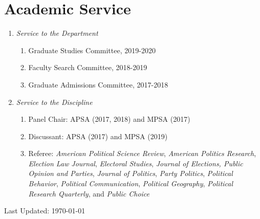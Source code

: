 \documentclass[12pt]{article}
\def\footerlink{}
\begin{document}
\section*{Academic Service} 

\begin{enumerate}[topsep = 0pt, itemsep = -1ex, partopsep  = 1ex, parsep = 1ex]
	
	\item[] \textit{Service to the Department}
	
	\begin{enumerate}[topsep = 0pt, itemsep = -1ex, partopsep = -1ex, parsep = 1ex]
		
		\item[] Graduate Studies Committee, 2019-2020
		\item[] Faculty Search Committee, 2018-2019 
		\item[] Graduate Admissions Committee, 2017-2018 \\
		
	\end{enumerate}

	\item[] \textit{Service to the Discipline}

	\begin{enumerate}[topsep = 0pt, itemsep = -1ex, partopsep  = -1ex, parsep = 1ex]
	
	\item[] Panel Chair: APSA (2017, 2018) and MPSA (2017)
	
	\item[] Discussant: APSA (2017) and MPSA (2019)
	
	\item[] Referee: \textit{American Political Science Review}, \textit{American Politics Research}, \textit{Election Law Journal}, \textit{Electoral Studies}, \textit{Journal of Elections, Public Opinion and Parties}, \textit{Journal of Politics},  \textit{Party Politics}, \textit{Political Behavior}, \textit{Political Communication}, \textit{Political Geography}, \textit{Political Research Quarterly}, and \textit{Public Choice} \\
	
	\end{enumerate}

\end{enumerate}

\bigskip

\begin{center}
  \begin{footnotesize}
    Last Updated: \today \\
    \href{\footerlink}{\texttt{\footerlink}}
  \end{footnotesize}
\end{center}
\end{document}

